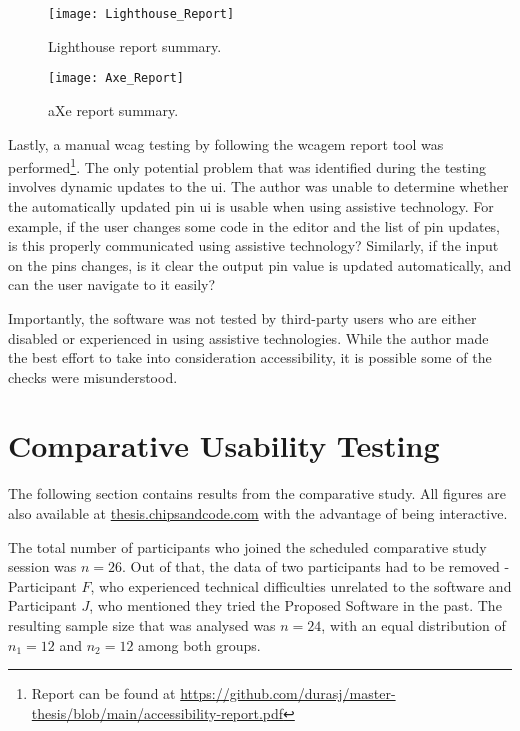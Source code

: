 \begin{figure}[H]
    \texttt{[image: Lighthouse\_Report]}
    \caption{Lighthouse report summary.}
    \label{fig:lighthouse-report}
\end{figure}

\begin{figure}[H]
    \texttt{[image: Axe\_Report]}
    \caption{aXe report summary.}
    \label{fig:axe-report}
\end{figure}

Lastly, a manual \gls{wcag} testing by following the \gls{wcagem} report tool was performed\footnote{Report can be found at \url{https://github.com/durasj/master-thesis/blob/main/accessibility-report.pdf}}.
The only potential problem that was identified during the testing involves dynamic updates to the \gls{ui}.
The author was unable to determine whether the automatically updated pin \gls{ui} is usable when using assistive technology.
For example, if the user changes some code in the editor and the list of pin updates, is this properly communicated using assistive technology?
Similarly, if the input on the pins changes, is it clear the output pin value is updated automatically, and can the user navigate to it easily?

Importantly, the software was not tested by third-party users who are either disabled or experienced in using assistive technologies.
While the author made the best effort to take into consideration accessibility, it is possible some of the checks were misunderstood.

\section{Comparative Usability Testing}
\label{Evaluation-UX}

The following section contains results from the comparative study.
All figures are also available at \href{https://thesis.chipsandcode.com}{thesis.chipsandcode.com} with the advantage of being interactive.

The total number of participants who joined the scheduled comparative study session was $n=26$.
Out of that, the data of two participants had to be removed - Participant $F$, who experienced technical difficulties unrelated to the software and Participant $J$, who mentioned they tried the Proposed Software in the past.
The resulting sample size that was analysed was $n=24$, with an equal distribution of $n_1=12$ and $n_2=12$ among both groups.

